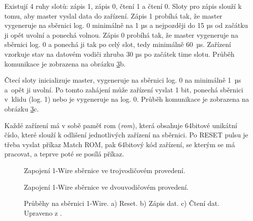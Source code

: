 Existují 4 ruhy slotů: zápis 1, zápis 0, čtení 1 a čtení 0. Sloty pro zápis slouží k tomu, aby master vyslal data do zařízení. Zápis 1 probíhá tak, že master vygeneruje na sběrnici log. 0 minimálně na 1 µs a nejpozději do 15 µs od začátku ji opět uvolní a ponechá volnou. Zápis 0 probíhá tak, že master vygeneruje na sběrnici log. 0 a ponechá ji tak po celý slot, tedy minimálně 60~µs. Zařízení vzorkuje stav na datovém vodiči zhruba 30 µs po začátek time slotu. Průběh komunikace je zobrazena na obrázku \ref{fig:1-wire-reset-vysilani-prijem-dat}b.

Čtecí sloty inicializuje master, vygeneruje na sběrnici log. 0 na minimálně 1~µs a~opět ji uvolní. Po tomto zahájení může zařízení vyslat 1 bit, ponechá sběrnici v~klidu (log. 1) nebo je vygeneruje na log. 0. Průběh komunikace je zobrazena na obrázku \ref{fig:1-wire-reset-vysilani-prijem-dat}c.

Každé zařízení má v sobě paměť \acrshort{rom} (\textit{\acrlong{rom}}), která obsahuje 64bitové unikátní číslo, které slouží k odlišení jednotlivých zařízení na sběrnici. Po RESET pulsu je třeba vyslat příkaz Match ROM, pak 64bitový kód zařízení, se kterým se má pracovat, a teprve poté se posílá příkaz.


\begin{figure}[H]
    \centering
    \def\svgwidth{\columnwidth}
    
    \caption{Zapojení 1-Wire sběrnice ve trojvodičovém provedení.}
    \label{fig:1-wire-sbernice-tri-vodice}
\end{figure}

\begin{figure}[H]
    \centering
    \def\svgwidth{\columnwidth}
    
    \caption{Zapojení 1-Wire sběrnice ve dvouvodičovém provedení.}
    \label{fig:1-wire-sbernice-dva-vodice}
\end{figure}

\newpage

\begin{figure}[H]
    \centering
    \def\svgwidth{0.99\columnwidth}
    
    \caption[Průběhy na sběrnici 1-Wire.]{Průběhy na sběrnici 1-Wire.
    a) Reset. b) Zápis dat. c) Čtení dat. Upraveno z \cite{1-wire-sbernice-prubehy}.}
    \label{fig:1-wire-reset-vysilani-prijem-dat}
\end{figure}

